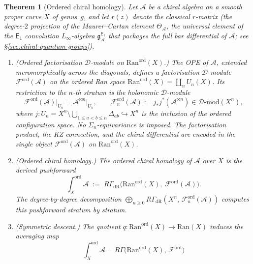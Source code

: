\documentclass[11pt,reqno]{amsart}
\newtheorem{theorem}{Theorem}[section]
\theoremstyle{definition}
\theoremstyle{remark}
\newcommand{\cA}{\mathcal{A}}
\newcommand{\cD}{\mathcal{D}}
\newcommand{\cF}{\mathcal{F}}
\newcommand{\Ran}{\mathrm{Ran}}
\newcommand{\Eone}{\mathsf{E}_{1}}
\newcommand{\gEone}{\mathfrak{g}^{\Eone}_{\cA}}
\numberwithin{equation}{section}
\begin{document}
\begin{theorem}[Ordered chiral homology]\label{thm:main-ord-ch}
Let $\cA$ be a chiral algebra on a smooth proper curve $X$
of genus~$g$, and let $r(z)$ denote the classical $r$-matrix
(the degree-$2$ projection of the Maurer--Cartan element
$\Theta_\cA$, the universal element of the $\Eone$
convolution $L_\infty$-algebra $\gEone$ that packages the
full bar differential of $\cA$; see
\S\ref{sec:chiral-quantum-groups}).
\begin{enumerate}[label=\textup{(\roman*)}]
\item \textup{(Ordered factorisation $\cD$-module on
  $\Ran^{\mathrm{ord}}(X)$.)}
  The OPE of $\cA$, extended meromorphically across the
  diagonals, defines a factorisation $\cD$-module
  $\cF^{\mathrm{ord}}(\cA)$ on the ordered Ran space
  $\Ran^{\mathrm{ord}}(X) = \coprod_n U_n(X)$. Its
  restriction to the $n$-th stratum is the holonomic
  $\cD$-module
  \begin{equation}\label{eq:fact-dmod}
    \cF^{\mathrm{ord}}(\cA)\big|_{U_n}
    = \cA^{\boxtimes n}\big|_{U_n},
    \qquad
    \cF_n^{\mathrm{ord}}(\cA)
    := j_* j^* (\cA^{\boxtimes n})
    \in \cD\text{-}\mathrm{mod}(X^n),
  \end{equation}
  where $j \colon U_n = X^n \setminus
  \bigcup_{1 \leq a < b \leq n}
  \Delta_{ab} \hookrightarrow X^n$ is the inclusion of
  the ordered configuration space. No $\Sigma_n$-equivariance
  is imposed. The factorisation product, the KZ connection,
  and the chiral differential are encoded in the single
  object $\cF^{\mathrm{ord}}(\cA)$ on
  $\Ran^{\mathrm{ord}}(X)$.
\item \textup{(Ordered chiral homology.)}
  The \emph{ordered chiral homology} of $\cA$ over $X$
  is the derived pushforward
  \begin{equation}\label{eq:ord-ch-hom}
    \int_X^{\mathrm{ord}} \cA
    \;:=\;
    R\Gamma_{\mathrm{dR}}\bigl(
    \Ran^{\mathrm{ord}}(X),\;
    \cF^{\mathrm{ord}}(\cA)\bigr).
  \end{equation}
  The degree-by-degree decomposition
  $\bigoplus_{n \geq 0}
  R\Gamma_{\mathrm{dR}}(X^n,\,
  \cF_n^{\mathrm{ord}}(\cA))$
  computes this pushforward stratum by stratum.
\item \textup{(Symmetric descent.)}
  The quotient
  $q \colon \Ran^{\mathrm{ord}}(X) \to \Ran(X)$
  induces the averaging map
  \begin{equation}\label{eq:descent}
    \int_X^{\mathrm{ord}} \cA
    = R\Gamma\bigl(\Ran^{\mathrm{ord}}(X),\,
    \cF^{\mathrm{ord}}\bigr)

\end{equation}
\end{enumerate}
\end{theorem}
\end{document}
